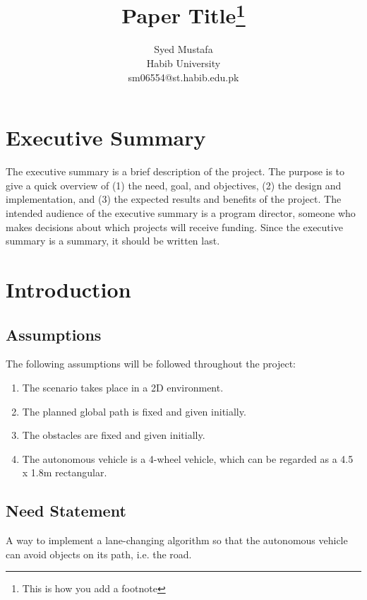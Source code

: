 \documentclass[11pt]{article}
\title{Paper Title\footnote{This is how you add a footnote}}
\author{Syed Mustafa \\ Habib University\\ sm06554@st.habib.edu.pk}
\begin{document}
\pagestyle{fancy}

\fancyhf{}


\tableofcontents

\newpage


\section{Executive Summary} \label{Executive summary}
The executive summary is a brief description of the project. The purpose is to give a quick overview of (1) the need, goal, and objectives, (2) the design and implementation, and (3) the expected results and benefits of the project. The intended audience of the executive summary is a program director, someone who makes decisions about which projects will receive funding. Since the executive summary is a summary, it should be written last.


\section{Introduction}\label{Intro}

\subsection{Assumptions}
The following assumptions will be followed throughout the project:
\begin{enumerate}
    \item The scenario takes place in a 2D environment.
    \item The planned global path is fixed and given initially.
    \item The obstacles are fixed and given initially.
    \item The autonomous vehicle is a 4-wheel vehicle, which can be regarded as a 4.5 x 1.8m rectangular.
\end{enumerate}

\subsection{Need Statement}\label{Need statement}
A way to implement a lane-changing algorithm so that the autonomous vehicle can avoid objects on its path, i.e. the road.
\end{document}
